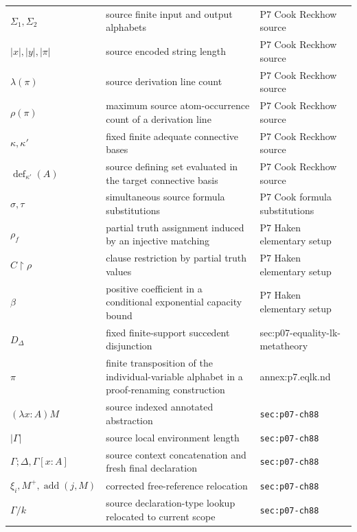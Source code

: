 \begin{longtable}{@{}p{}p{}p{}@{}}
\(\Sigma_1,\allowbreak \Sigma_2\) & source finite input and output alphabets & P7 Cook Reckhow source \\
\(|x|,\allowbreak |y|,\allowbreak |\pi|\) & source encoded string length & P7 Cook Reckhow source \\
\(\lambda(\pi)\) & source derivation line count & P7 Cook Reckhow source \\
\(\rho(\pi)\) & maximum source atom-occurrence count of a derivation line & P7 Cook Reckhow source \\
\(\kappa,\allowbreak \kappa'\) & fixed finite adequate connective bases & P7 Cook Reckhow source \\
\(\operatorname{def}_{\kappa'}(A)\) & source defining set evaluated in the target connective basis & P7 Cook Reckhow source \\
\(\sigma,\allowbreak \tau\) & simultaneous source formula substitutions & P7 Cook formula substitutions \\
\(\rho_f\) & partial truth assignment induced by an injective matching & P7 Haken elementary setup \\
\(C\upharpoonright\rho\) & clause restriction by partial truth values & P7 Haken elementary setup \\
\(\beta\) & positive coefficient in a conditional exponential capacity bound & P7 Haken elementary setup \\
\(D_\Delta\) & fixed finite-support succedent disjunction & sec:\allowbreak{}p07-\allowbreak{}equality-\allowbreak{}lk-\allowbreak{}metatheory \\
\(\pi\) & finite transposition of the individual-variable alphabet in a proof-renaming construction & annex:\allowbreak{}p7.\allowbreak{}eqlk.\allowbreak{}nd \\
\((\lambda x:A)M\) & source indexed annotated abstraction & \texttt{sec:\allowbreak{}p07-\allowbreak{}ch88} \\
\(|\Gamma|\) & source local environment length & \texttt{sec:\allowbreak{}p07-\allowbreak{}ch88} \\
\(\Gamma;\allowbreak \Delta,\allowbreak \Gamma[x:A]\) & source context concatenation and fresh final declaration & \texttt{sec:\allowbreak{}p07-\allowbreak{}ch88} \\
\(\xi_i,\allowbreak M^+,\allowbreak \operatorname{add}(j,\allowbreak M)\) & corrected free-reference relocation & \texttt{sec:\allowbreak{}p07-\allowbreak{}ch88} \\
\(\Gamma/k\) & source declaration-type lookup relocated to current scope & \texttt{sec:\allowbreak{}p07-\allowbreak{}ch88} \\

\end{longtable}
